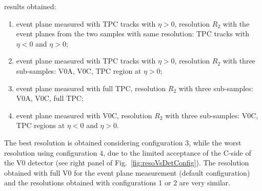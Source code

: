 results obtained:
\begin{enumerate}
\item event plane measured with TPC tracks with $\eta > 0$,  
resolution $R_2$ with the event planes from the two samples with same resolution: 
TPC tracks with $\eta < 0$ and $\eta > 0$;
\item event plane measured with TPC tracks with $\eta > 0$,  
resolution $R_2$ with three sub-samples: V0A, V0C, TPC region at $\eta > 0$; 
\item event plane measured with full TPC,  
resolution $R_2$ with three sub-samples: V0A, V0C, full TPC; 
\item event plane measured with V0C,  
resolution $R_2$ with three sub-samples:  V0C, TPC regions at $\eta < 0$ and $\eta > 0$.
\end{enumerate}
The best resolution is obtained considering configuration 3, 
while the worst resolution using configuration 4, due to
the limited acceptance of the C-side of the V0 detector (see right panel 
of Fig.~\ref{fig:resoVsDetConfig}). 
The resolution obtained with full V0 for the event
plane measurement (default configuration) and the 
resolutions obtained with configurations 1 or 2 are very similar. 
\\


